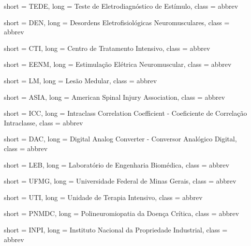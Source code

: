  {
	short = TEDE,
	long = Teste de Eletrodiagnóstico de Estímulo,
	class = abbrev
}

 {
	short = DEN,
	long = Desordens Eletrofisiológicas Neuromusculares,
	class = abbrev
}

 {
	short = CTI,
	long = Centro de Tratamento Intensivo,
	class = abbrev
}

 {
	short = EENM,
	long =  Estimulação Elétrica Neuromuscular,
	class = abbrev
}

 {
	short = LM,
	long =  Lesão Medular,
	class = abbrev
}

 {
	short = ASIA,
	long =  American Spinal Injury Association,
	class = abbrev
}

 {
	short = ICC,
	long =  Intraclass Correlation Coefficient - Coeficiente de Correlação Intraclasse,
	class = abbrev
}

 {
	short = DAC,
	long =  Digital Analog Converter - Conversor Analógico Digital,
	class = abbrev
}

 {
	short = LEB,
	long =  Laboratório de Engenharia Biomédica,
	class = abbrev
}

 {
	short = UFMG,
	long =  Universidade Federal de Minas Gerais,
	class = abbrev
}

 {
	short = UTI,
	long =  Unidade de Terapia Intensivo,
	class = abbrev
}

 {
	short = PNMDC,
	long =  Polineuromiopatia da Doença Crítica,
	class = abbrev
}

 {
	short = INPI,
	long =  Instituto Nacional da Propriedade Industrial,
	class = abbrev
}